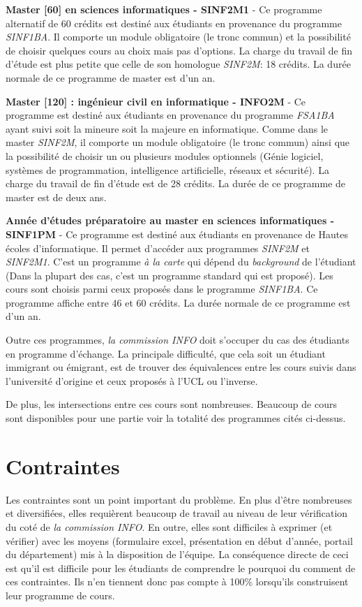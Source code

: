 \textbf{Master [60] en sciences informatiques - SINF2M1} \cite{SINF2M1} - Ce programme alternatif de 60 crédits est destiné aux étudiants en provenance du programme \textit{SINF1BA}. Il comporte un module obligatoire (le tronc commun) et la possibilité de choisir quelques cours au choix mais pas d'options. La charge du travail de fin d'étude est plus petite que celle de son homologue  \textit{SINF2M}: 18 crédits. La durée normale de ce programme de master est d'un an. 

\textbf{Master [120] : ingénieur civil en informatique - INFO2M} \cite{INFO2M} - Ce programme est destiné aux étudiants en provenance du programme \textit{FSA1BA} ayant suivi soit la mineure soit la majeure en informatique. Comme dans le master \textit{SINF2M}, il comporte un module obligatoire (le tronc commun) ainsi que la possibilité de choisir un ou plusieurs modules optionnels (Génie logiciel, systèmes de programmation, intelligence artificielle, réseaux et sécurité). La charge du travail de fin d'étude est de 28 crédits. La durée de ce programme de master est de deux ans.  

\textbf{Année d'études préparatoire au master en sciences informatiques - SINF1PM} \cite{SINF1PM} - Ce programme est destiné aux étudiants en provenance de Hautes écoles d'informatique. Il permet d'accéder aux programmes \textit{SINF2M} et \textit{SINF2M1}. C'est un programme \textit{à la carte} qui dépend du \textit{background} de l'étudiant (Dans la plupart des cas, c'est un programme standard qui est proposé). Les cours sont choisis parmi ceux proposés dans le programme \textit{SINF1BA}. Ce programme affiche entre 46 et 60 crédits. La durée normale de ce programme est d'un an.  
 

Outre ces programmes, \textit{la commission INFO} doit s'occuper du cas des étudiants en programme d'échange. La principale difficulté, que cela soit un étudiant immigrant ou émigrant, est de trouver des équivalences entre les cours suivis dans l'université d'origine et ceux proposés à l'UCL ou l'inverse. 

De plus, les intersections entre ces cours sont nombreuses. Beaucoup de cours sont disponibles pour une partie voir la totalité des programmes cités ci-dessus.  
\clearpage
\section{Contraintes}
\label{contraintes_intro}

Les contraintes sont un point important du problème. En plus d'être nombreuses et diversifiées, elles requièrent beaucoup de travail au niveau de leur vérification du coté de \textit{la commission INFO}. En outre, elles sont difficiles à exprimer (et vérifier) avec les moyens (formulaire excel, présentation en début d'année, portail du département) mis à la disposition de l'équipe. La conséquence directe de ceci est qu'il est difficile pour les étudiants de comprendre le pourquoi du comment de ces contraintes. Ils n'en tiennent donc pas compte à 100\% lorsqu'ils construisent leur programme de cours.

